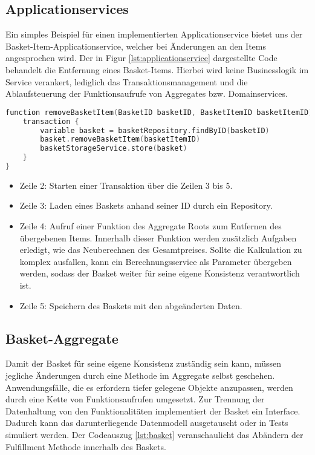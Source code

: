 \subsection{Applicationservices}

Ein simples Beispiel für einen implementierten Applicationservice bietet uns der Basket-Item-Applicationservice, welcher bei Änderungen an den Items angesprochen wird. Der in Figur \ref{lst:applicationservice} dargestellte Code behandelt die Entfernung eines Basket-Items. Hierbei wird keine Businesslogik im Service verankert, lediglich das Transaktionsmanagement und die Ablaufsteuerung der Funktionsaufrufe von Aggregates bzw. Domainservices.

\begin{minipage}{\linewidth} %
	\begin{lstlisting}[caption={Eine Beispielsfunktion des BasketItem-Applikationservice}, label={lst:applicationservice}, language=Kotlin]
function removeBasketItem(BasketID basketID, BasketItemID basketItemID) {
	transaction {
		variable basket = basketRepository.findByID(basketID)
		basket.removeBasketItem(basketItemID)
		basketStorageService.store(basket)
	}
}
	\end{lstlisting}


	\begin{itemize}[noitemsep,nolistsep]
		\item Zeile 2: Starten einer Transaktion über die Zeilen 3 bis 5.
		\item Zeile 3: Laden eines Baskets anhand seiner ID durch ein Repository. 
		\item Zeile 4: Aufruf einer Funktion des Aggregate Roots zum Entfernen des übergebenen Items. Innerhalb dieser Funktion werden zusätzlich Aufgaben erledigt, wie das Neuberechnen des Gesamtpreises. Sollte die Kalkulation zu komplex ausfallen, kann ein Berechnungsservice als Parameter übergeben werden, sodass der Basket weiter für seine eigene Konsistenz verantwortlich ist. 
		\item Zeile 5: Speichern des Baskets mit den abgeänderten Daten.
	\end{itemize}
\end{minipage}

\subsection{Basket-Aggregate}

Damit der Basket für seine eigene Konsistenz zuständig sein kann, müssen jegliche Änderungen durch eine Methode im Aggregate selbst geschehen. Anwendungsfälle, die es erfordern tiefer gelegene Objekte anzupassen, werden durch eine Kette von Funktionsaufrufen umgesetzt. Zur Trennung der Datenhaltung von den Funktionalitäten implementiert der Basket ein Interface. Dadurch kann das darunterliegende Datenmodell ausgetauscht oder in Tests simuliert werden. Der Codeauszug \ref{lst:basket} veranschaulicht das Abändern der Fulfillment Methode innerhalb des Baskets.

